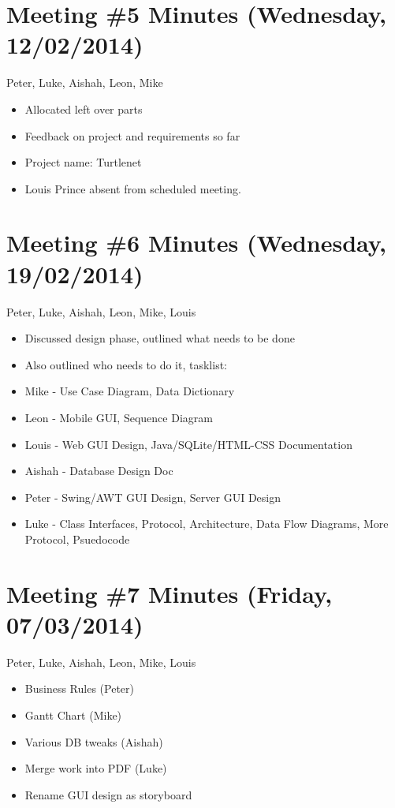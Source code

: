 \section{Meeting \#5 Minutes (Wednesday, 12/02/2014)}
Peter, Luke, Aishah, Leon, Mike
\begin{itemize}
\item Allocated left over parts
\item Feedback on project and requirements so far
\item Project name: Turtlenet
\item Louis Prince absent from scheduled meeting.
\end{itemize}

\section{Meeting \#6 Minutes (Wednesday, 19/02/2014)}
Peter, Luke, Aishah, Leon, Mike, Louis
\begin{itemize}
\item Discussed design phase, outlined what needs to be done
\item Also outlined who needs to do it, tasklist:
\item Mike - Use Case Diagram, Data Dictionary
\item Leon - Mobile GUI, Sequence Diagram
\item Louis - Web GUI Design, Java/SQLite/HTML-CSS Documentation
\item Aishah - Database Design Doc
\item Peter - Swing/AWT GUI Design, Server GUI Design
\item Luke - Class Interfaces, Protocol, Architecture, Data Flow Diagrams, More Protocol, Psuedocode
\end{itemize}

\section{Meeting \#7 Minutes (Friday, 07/03/2014)}
Peter, Luke, Aishah, Leon, Mike, Louis
\begin{itemize}
\item Business Rules (Peter)
\item Gantt Chart (Mike)
\item Various DB tweaks (Aishah)
\item Merge work into PDF (Luke)
\item Rename GUI design as storyboard
\end{itemize}

